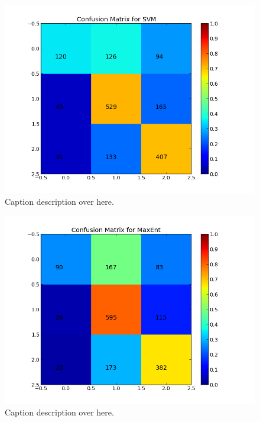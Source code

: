\begin{minipage}[c]{\linewidth}
     \centering
     \begin{minipage}{0.45\linewidth}
          \begin{figure}[H]
               \includegraphics[width=\linewidth]{../img/plots/grid/confusion_matrix_SVM.png}
           \caption[Results overview across models]{Caption description over here.}
           \label{fig:confmat_svm}
          \end{figure}
     \end{minipage}
     \hspace{0.05\linewidth}
     \begin{minipage}{0.45\linewidth}
          \begin{figure}[H]
               \includegraphics[width=\linewidth]{../img/plots/grid/confusion_matrix_MaxEnt.png}
           \caption[Results overview across models]{Caption description over here.}
           \label{fig:confmat_maxent}
          \end{figure}
     \end{minipage} \\
 

\end{minipage}
